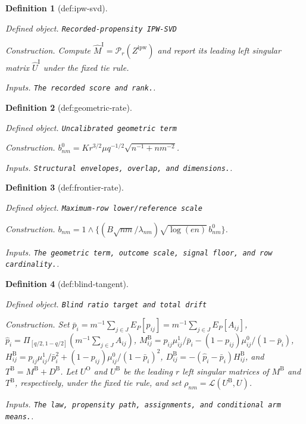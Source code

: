 \documentclass{article}
\newtheorem{definition}{Definition}
\begin{document}
\begin{definition}[def:ipw-svd]\label{def:ipw-svd}
\par\smallskip\noindent\emph{Defined object.} \texttt{Recorded-\allowbreak{}propensity IPW-\allowbreak{}SVD}
\par\smallskip\noindent\emph{Construction.} Compute \(\widehat M^{\mathrm I}=\mathcal P_r(Z^{\mathrm{ipw}})\) and report its leading left singular matrix \(\widehat U^{\mathrm I}\) under the fixed tie rule.
\par\smallskip\noindent\emph{Inputs.} \texttt{The recorded score and rank.}.
\end{definition}

\begin{definition}[def:geometric-rate]\label{def:geometric-rate}
\par\smallskip\noindent\emph{Defined object.} \texttt{Uncalibrated geometric term}
\par\smallskip\noindent\emph{Construction.} \(b^0_{nm}=K r^{3/2}\mu q^{-1/2}\sqrt{n^{-1}+nm^{-2}}\).
\par\smallskip\noindent\emph{Inputs.} \texttt{Structural envelopes,\allowbreak{} overlap,\allowbreak{} and dimensions.}.
\end{definition}

\begin{definition}[def:frontier-rate]\label{def:frontier-rate}
\par\smallskip\noindent\emph{Defined object.} \texttt{Maximum-\allowbreak{}row lower/\allowbreak{}reference scale}
\par\smallskip\noindent\emph{Construction.} \(b_{nm}=1\wedge\{(B\sqrt{nm}/\lambda_{nm})\sqrt{\log(en)}\,b^0_{nm}\}\).
\par\smallskip\noindent\emph{Inputs.} \texttt{The geometric term,\allowbreak{} outcome scale,\allowbreak{} signal floor,\allowbreak{} and row cardinality.}.
\end{definition}

\begin{definition}[def:blind-tangent]\label{def:blind-tangent}
\par\smallskip\noindent\emph{Defined object.} \texttt{Blind ratio target and total drift}
\par\smallskip\noindent\emph{Construction.} Set \(\bar p_i=m^{-1}\sum_{j\in J}E_P[p_{ij}]=m^{-1}\sum_{j\in J}E_P[A_{ij}]\), \(\widehat p_i=\Pi_{[q/2,1-q/2]}(m^{-1}\sum_{j\in J}A_{ij})\), \(M^{\mathrm B}_{ij}=p_{ij}\mu^1_{ij}/\bar p_i-(1-p_{ij})\mu^0_{ij}/(1-\bar p_i)\), \(H^{\mathrm B}_{ij}=p_{ij}\mu^1_{ij}/\bar p_i^2+(1-p_{ij})\mu^0_{ij}/(1-\bar p_i)^2\), \(D^{\mathrm B}_{ij}=-(\widehat p_i-\bar p_i)H^{\mathrm B}_{ij}\), and \(T^{\mathrm B}=M^{\mathrm B}+D^{\mathrm B}\). Let \(U^{\mathrm O}\) and \(U^{\mathrm B}\) be the leading \(r\) left singular matrices of \(M^{\mathrm B}\) and \(T^{\mathrm B}\), respectively, under the fixed tie rule, and set \(\rho_{nm}=\mathcal L(U^{\mathrm B},U)\).
\par\smallskip\noindent\emph{Inputs.} \texttt{The law,\allowbreak{} propensity path,\allowbreak{} assignments,\allowbreak{} and conditional arm means.}.
\end{definition}
\end{document}
